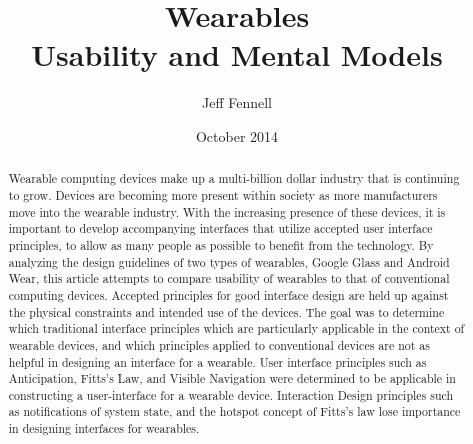 \documentclass[12pt]{article}
\begin{document}
\title{Wearables \\ \vspace{2 mm} {\large Usability and Mental Models}}
\author{Jeff Fennell}
\date{October 2014}
\maketitle

\begin{abstract}
Wearable computing devices make up a multi-billion dollar industry that is continuing to grow. Devices are becoming more present within society as more manufacturers move into the wearable industry. With the increasing presence of these devices, it is important to develop accompanying interfaces that utilize accepted user interface principles, to allow as many people as possible to benefit from the technology. By analyzing the design guidelines of two types of wearables, Google Glass and Android Wear, this article attempts to compare usability of wearables to that of conventional computing devices. Accepted principles for good interface design are held up against the physical constraints and intended use of the devices. The goal was to determine which traditional interface principles which are particularly applicable in the context of wearable devices, and which principles applied to conventional devices are not as helpful in designing an interface for a wearable. User interface principles such as Anticipation, Fitts's Law, and Visible Navigation were determined to be applicable in constructing a user-interface for a wearable device. Interaction Design principles such as notifications of system state, and the hotspot concept of Fitts's law lose importance in designing interfaces for wearables.
\end{abstract}

\tableofcontents
\end{document}
